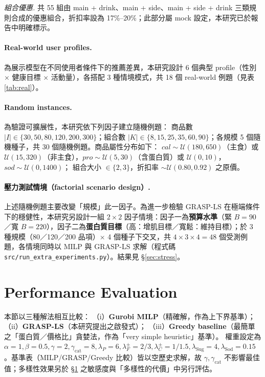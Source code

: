 \documentclass[a4paper]{article}
\begin{document}
\textit{組合優惠.} 共 55 組由 main + drink、main + side、main + side + drink 三類規則合成的優惠組合，折扣率設為 17\%--20\%；此部分屬 mock 設定，本研究已於報告中明確標示。

\paragraph{Real-world user profiles.}為展示模型在不同使用者條件下的推薦差異，本研究設計 6 個典型 profile（性別 × 健康目標 × 活動量），各搭配 3 種情境模式，共 18 個 real-world 例題（見表 \ref{tab:real}）。

\paragraph{Random instances.}為驗證可擴展性，本研究依下列因子建立隨機例題：
商品數 $|I|\in\{30,50,80,120,200,300\}$；組合數 $|K|\in\{8,15,25,35,60,90\}$；各規模 5 個隨機種子，共 30 個隨機例題。商品屬性分布如下：
$cal\sim \mathcal{U}(180,650)$（主食）或 $\mathcal{U}(15,320)$（非主食），$pro\sim \mathcal{U}(5,30)$（含蛋白質）或 $\mathcal{U}(0,10)$，$sod\sim \mathcal{U}(0,1400)$；
組合大小 $\in\{2,3\}$，折扣率 $\sim \mathcal{U}(0.80,0.92)$ 之原價。

\paragraph{壓力測試情境（factorial scenario design）.}上述隨機例題主要改變「規模」此一因子。為進一步檢驗 GRASP-LS 在極端條件下的穩健性，本研究另設計一組 $2\times2$ 因子情境：因子一為\textbf{預算水準}（緊 $B=90$／寬 $B=220$），因子二為\textbf{蛋白質目標}（高：增肌目標／寬鬆：維持目標）；於 3 種規模（80／120／200 品項）$\times$ 4 個種子下交叉，共 $4\times3\times4=48$ 個受測例題，各情境同時以 MILP 與 GRASP-LS 求解（程式碼 \texttt{src/run\_extra\_experiments.py}）。結果見 \S\ref{sec:stress}。

\section{Performance Evaluation}\label{sec:exp}
本節以三種解法相互比較：
（i）\textbf{Gurobi MILP}（精確解，作為上下界基準）；
（ii）\textbf{GRASP-LS}（本研究提出之啟發式）；
（iii）\textbf{Greedy baseline}（最簡單之「蛋白質／價格比」貪婪法，作為「very simple heuristic」基準）。
權重設定為 $\alpha=1, \beta=0.5, \gamma=2, \gamma_{\text{cat}}=8, \lambda_P=6, \lambda^\pm_F = 2/3, \lambda^\pm_C = 1/1.5, \lambda_{\text{Sug}}=4, \lambda_{\text{Sod}}=0.15$。基準表（MILP/GRASP/Greedy 比較）皆以空歷史求解，故 $\gamma,\gamma_{\text{cat}}$ 不影響最佳值；多樣性效果另於 \S\ref{sec:exp} 之敏感度與「多樣性的代價」中另行評估。
\end{document}

